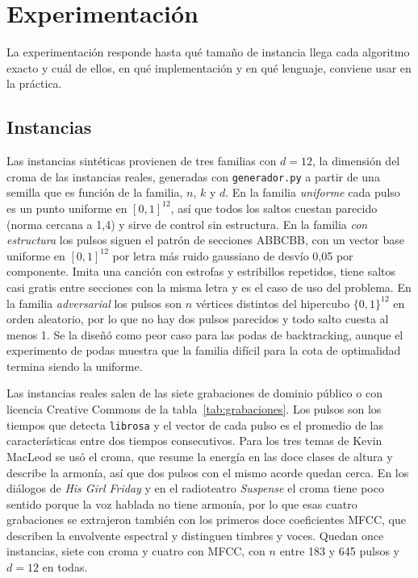 \section{Experimentación}
\label{sec:experimentacion}

La experimentación responde hasta qué tamaño de instancia llega cada algoritmo exacto y cuál de ellos, en qué implementación y en qué lenguaje, conviene usar en la práctica.

\subsection{Instancias}
\label{sec:datasets}

Las instancias sintéticas provienen de tres familias con $d = 12$, la dimensión del croma de las instancias reales, generadas con \texttt{generador.py} a partir de una semilla que es función de la familia, $n$, $k$ y $d$. En la familia \emph{uniforme} cada pulso es un punto uniforme en $[0,1]^{12}$, así que todos los saltos cuestan parecido (norma cercana a 1,4) y sirve de control sin estructura. En la familia \emph{con estructura} los pulsos siguen el patrón de secciones ABBCBB, con un vector base uniforme en $[0,1]^{12}$ por letra más ruido gaussiano de desvío 0,05 por componente. Imita una canción con estrofas y estribillos repetidos, tiene saltos casi gratis entre secciones con la misma letra y es el caso de uso del problema. En la familia \emph{adversarial} los pulsos son $n$ vértices distintos del hipercubo $\{0,1\}^{12}$ en orden aleatorio, por lo que no hay dos pulsos parecidos y todo salto cuesta al menos 1. Se la diseñó como peor caso para las podas de backtracking, aunque el experimento de podas muestra que la familia difícil para la cota de optimalidad termina siendo la uniforme.

Las instancias reales salen de las siete grabaciones de dominio público o con licencia Creative Commons de la tabla~\ref{tab:grabaciones}. Los pulsos son los tiempos que detecta \texttt{librosa} y el vector de cada pulso es el promedio de las características entre dos tiempos consecutivos. Para los tres temas de Kevin MacLeod se usó el croma, que resume la energía en las doce clases de altura y describe la armonía, así que dos pulsos con el mismo acorde quedan cerca. En los diálogos de \emph{His Girl Friday} y en el radioteatro \emph{Suspense} el croma tiene poco sentido porque la voz hablada no tiene armonía, por lo que esas cuatro grabaciones se extrajeron también con los primeros doce coeficientes MFCC, que describen la envolvente espectral y distinguen timbres y voces. Quedan once instancias, siete con croma y cuatro con MFCC, con $n$ entre 183 y 645 pulsos y $d = 12$ en todas.

